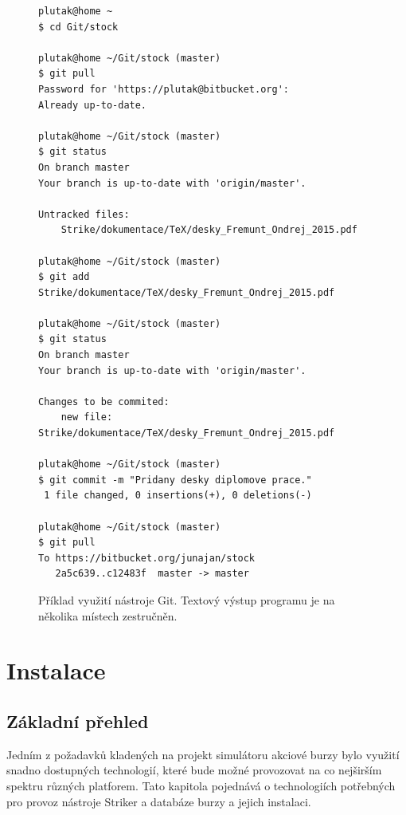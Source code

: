 \documentclass[thesis=M,czech]{FITthesis}[2012/06/26]
\begin{document}
\begin{figure}\centering
	\begin{lstlisting}[basicstyle={\scriptsize\ttfamily}, frame=single] 
plutak@home ~
$ cd Git/stock

plutak@home ~/Git/stock (master)
$ git pull
Password for 'https://plutak@bitbucket.org':
Already up-to-date.

plutak@home ~/Git/stock (master)
$ git status
On branch master
Your branch is up-to-date with 'origin/master'.

Untracked files:
	Strike/dokumentace/TeX/desky_Fremunt_Ondrej_2015.pdf

plutak@home ~/Git/stock (master)
$ git add Strike/dokumentace/TeX/desky_Fremunt_Ondrej_2015.pdf

plutak@home ~/Git/stock (master)
$ git status
On branch master
Your branch is up-to-date with 'origin/master'.

Changes to be commited:
	new file: Strike/dokumentace/TeX/desky_Fremunt_Ondrej_2015.pdf

plutak@home ~/Git/stock (master)
$ git commit -m "Pridany desky diplomove prace."
 1 file changed, 0 insertions(+), 0 deletions(-)

plutak@home ~/Git/stock (master)
$ git pull
To https://bitbucket.org/junajan/stock
   2a5c639..c12483f  master -> master
	\end{lstlisting}
	\caption[Příklad využití nástroje Git]{Příklad využití nástroje Git. Textový výstup programu je na několika místech zestručněn.}\label{fig:impl-git}
\end{figure}


\chapter{Instalace}

\section{Základní přehled}

Jedním z požadavků kladených na projekt simulátoru akciové burzy bylo využití snadno dostupných technologií, které 
bude možné provozovat na co nejširším spektru různých platforem. Tato kapitola pojednává o technologiích potřebných 
pro provoz nástroje Striker a databáze burzy a jejich instalaci.

\end{document}

